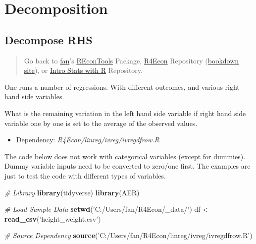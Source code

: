 \documentclass[
]{book}
\newenvironment{Shaded}{\begin{snugshade}}{\end{snugshade}}
\newcommand{\CommentTok}[1]{\textcolor[rgb]{0.56,0.35,0.01}{\textit{#1}}}
\newcommand{\KeywordTok}[1]{\textcolor[rgb]{0.13,0.29,0.53}{\textbf{#1}}}
\newcommand{\NormalTok}[1]{#1}
\newcommand{\StringTok}[1]{\textcolor[rgb]{0.31,0.60,0.02}{#1}}
\providecommand{\tightlist}{%
  \setlength{\itemsep}{0pt}\setlength{\parskip}{0pt}}
\begin{document}
\hypertarget{decomposition}{%
\section{Decomposition}\label{decomposition}}

\hypertarget{decompose-rhs}{%
\subsection{Decompose RHS}\label{decompose-rhs}}

\begin{quote}
Go back to \href{http://fanwangecon.github.io/}{fan}'s \href{https://fanwangecon.github.io/REconTools/}{REconTools} Package, \href{https://fanwangecon.github.io/R4Econ/}{R4Econ} Repository (\href{https://fanwangecon.github.io/R4Econ/bookdown}{bookdown site}), or \href{https://fanwangecon.github.io/Stat4Econ/}{Intro Stats with R} Repository.
\end{quote}

One runs a number of regressions. With different outcomes, and various right hand side variables.

What is the remaining variation in the left hand side variable if right hand side variable one by one is set to the average of the observed values.

\begin{itemize}
\tightlist
\item
  Dependency: \emph{R4Econ/linreg/ivreg/ivregdfrow.R}
\end{itemize}

The code below does not work with categorical variables (except for dummies). Dummy variable inputs need to be converted to zero/one first. The examples are just to test the code with different types of variables.

\begin{Shaded}
\begin{Highlighting}[]
\CommentTok{# Library}
\KeywordTok{library}\NormalTok{(tidyverse)}
\KeywordTok{library}\NormalTok{(AER)}

\CommentTok{# Load Sample Data}
\KeywordTok{setwd}\NormalTok{(}\StringTok{'C:/Users/fan/R4Econ/_data/'}\NormalTok{)}
\NormalTok{df <-}\StringTok{ }\KeywordTok{read_csv}\NormalTok{(}\StringTok{'height_weight.csv'}\NormalTok{)}

\CommentTok{# Source Dependency}
\KeywordTok{source}\NormalTok{(}\StringTok{'C:/Users/fan/R4Econ/linreg/ivreg/ivregdfrow.R'}\NormalTok{)}
\end{Highlighting}
\end{Shaded}
\end{document}
